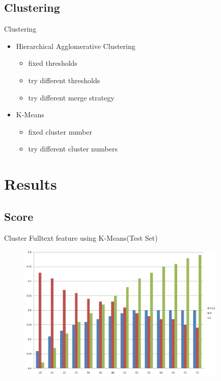 \documentclass{beamer}
\begin{document}
\subsection{Clustering}
\begin{frame}{Clustering}
    \begin{itemize}
    \item Hierarchical Agglomerative Clustering
        \begin{itemize}
        \item fixed thresholds
        \item try different thresholds
        \item try different merge strategy
        \end{itemize}
    \item K-Means
        \begin{itemize}
        \item fixed cluster number
        \item try different cluster numbers
        \end{itemize}
    \end{itemize}
\end{frame}


\section{Results}
\subsection{Score}
\begin{frame}[plain]{Cluster Fulltext feature using K-Means(Test Set)}
\begin{figure}
\includegraphics[width=100mm]{kmeans}
\end{figure}
\end{frame}
\end{document}
